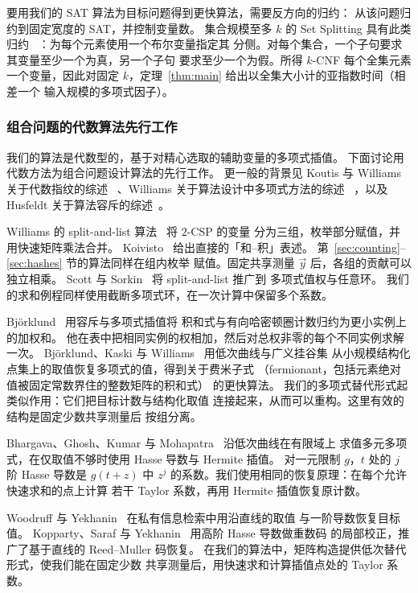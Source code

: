 要用我们的 SAT 算法为目标问题得到更快算法，需要反方向的归约：
从该问题归约到固定宽度的 SAT，并控制变量数。
集合规模至多 $k$ 的 Set Splitting 具有此类归约
~\cite[Observation~3.6]{CDL16}：为每个元素使用一个布尔变量指定其
分侧。对每个集合，一个子句要求其变量至少一个为真，另一个子句
要求至少一个为假。所得 $k$-CNF 每个全集元素一个变量，因此对固定
$k$，定理~\ref{thm:main} 给出以全集大小计的亚指数时间（相差一个
输入规模的多项式因子）。

\subsubsection{组合问题的代数算法先行工作}\label{subsec:related-algebraic}
我们的算法是代数型的，基于对精心选取的辅助变量的多项式插值。
下面讨论用代数方法为组合问题设计算法的先行工作。
更一般的背景见 Koutis 与 Williams 关于代数指纹的综述
~\cite{KW16}、Williams 关于算法设计中多项式方法的综述
~\cite{Wil14}，以及 Husfeldt 关于算法容斥的综述~\cite{Hus11}。

Williams 的 split-and-list 算法~\cite{Wil05} 将 $2$-CSP 的变量
分为三组，枚举部分赋值，并用快速矩阵乘法合并。
Koivisto~\cite{Koi06} 给出直接的「和--积」表述。
第~\ref{sec:counting}--\ref{sec:hashes} 节的算法同样在组内枚举
赋值。固定共享测量 $\vec y$ 后，各组的贡献可以独立相乘。
Scott 与 Sorkin~\cite[Section~6]{SS09} 将 split-and-list 推广到
多项式值权与任意环。
我们的求和例程同样使用截断多项式环，在一次计算中保留多个系数。

Bj\"orklund~\cite[Sections~2--3]{Bjo16} 用容斥与多项式插值将
积和式与有向哈密顿圈计数归约为更小实例上的加权和。
他在表中把相同实例的权相加，然后对总权非零的每个不同实例求解一次。
Bj\"orklund、Kaski 与 Williams~\cite{BKW19} 用低次曲线与广义挂谷集
从小规模结构化点集上的取值恢复多项式的值，得到关于费米子式
（fermionant，包括元素绝对值被固定常数界住的整数矩阵的积和式）
的更快算法。
我们的多项式替代形式起类似作用：它们把目标计数与结构化取值
连接起来，从而可以重构。这里有效的结构是固定少数共享测量后
按组分离。

Bhargava、Ghosh、Kumar 与
Mohapatra~\cite[Sections~3.1--3.2]{BGKM23} 沿低次曲线在有限域上
求值多元多项式，在仅取值不够时使用 Hasse 导数与 Hermite 插值。
对一元限制 $g$，$t$ 处的 $j$ 阶 Hasse 导数是 $g(t+z)$ 中 $z^j$
的系数。我们使用相同的恢复原理：在每个允许快速求和的点上计算
若干 Taylor 系数，再用 Hermite 插值恢复原计数。

Woodruff 与 Yekhanin~\cite{WY07} 在私有信息检索中用沿直线的取值
与一阶导数恢复目标值。
Kopparty、Saraf 与 Yekhanin~\cite{KSY14} 用高阶 Hasse 导数做重数码
的局部校正，推广了基于直线的 Reed--Muller 码恢复。
在我们的算法中，矩阵构造提供低次替代形式，使我们能在固定少数
共享测量后，用快速求和计算插值点处的 Taylor 系数。

